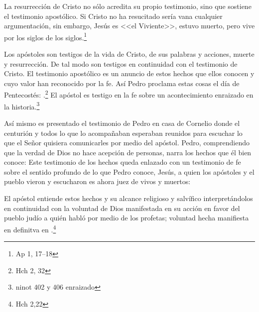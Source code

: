 La resurrección de Cristo no sólo acredita su propio testimonio, sino que
sostiene el testimonio apostólico. Si Cristo no ha resucitado sería vana
cualquier argumentación, sin embargo, Jesús es <<el Viviente>>, estuvo muerto,
pero vive por los siglos de los siglos.\footnote{Ap 1, 17--18}

Los apóstoles son testigos de la vida de Cristo, de sus palabras y acciones,
muerte y resurrección. De tal modo son testigos en continuidad con el testimonio
de Cristo. El testimonio apostólico es un anuncio de estos hechos que ellos
conocen y cuyo valor han reconocido por la fe. Así Pedro proclama estas cosas el
día de Pentecostés: .\footnote{Hch 2, 32} El apóstol es testigo en
la fe sobre un acontecimiento enraizado en la historia.\footnote{ninot 402 y 406
  enraizado}

Así mismo es presentado el testimonio de Pedro en casa de Cornelio donde el
centurión y todos lo que lo acompañaban esperaban reunidos para escuchar lo que
el Señor quisiera comunicarles por medio del apóstol. Pedro, comprendiendo que
la verdad de Dios no hace acepción de personas, narra los hechos que él bien
conoce:  Este testimonio de los hechos queda
enlazado con un testimonio de fe sobre el sentido profundo de lo que Pedro
conoce, Jesús, a quien los apóstoles y el pueblo vieron y escucharon es ahora
juez de vivos y muertos:

El apóstol entiende estos hechos y su alcance religioso y salvífico
interpretándolos en continuidad con la voluntad de Dios manifestada en su acción
en favor del pueblo judío a quién habló por medio de los profetas; voluntad
hecha manifiesta en definitva en .\footnote{Hch 2,22}

